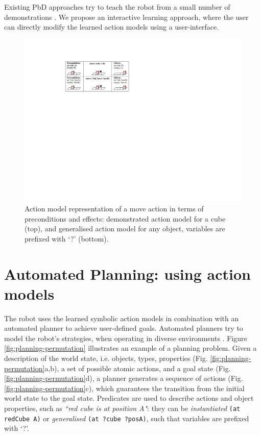 Existing PbD approaches try to teach the robot from a small number of demonstrations \cite{EricM.Orendt2016,abdo2013learning}. We propose an interactive learning approach, where the user can directly modify the learned action models using a user-interface.

  \begin{figure}[!h]
	\centering
	\includegraphics[width=0.7\linewidth]{figures/schema-logic}
	\caption{Action model representation of a move action in terms of preconditions and effects: demonstrated action model for a cube (top), and generalised action model for any object, variables are prefixed with `?' (bottom).}
	\label{fig:action}
\end{figure}

\section{Automated Planning: using action models}\label{sec:AP}
The robot uses the learned symbolic action models in combination with an automated planner to achieve user-defined goals. Automated planners try to model the robot's strategies, when operating in diverse environments \cite{ghallab2004automated}.
Figure \ref{fig:planning-permutation} illustrates an example of a planning problem. Given a description of the world state, i.e. objects, types, properties (Fig. \ref{fig:planning-permutation}a,b), a set of possible atomic actions, and a goal state (Fig. \ref{fig:planning-permutation}d), a planner generates a sequence of actions (Fig. \ref{fig:planning-permutation}c), which guarantees the transition from the initial world state to the goal state. Predicates are used to describe actions and object properties, such as \textit{``red cube is at position A"}: they can be \textit{instantiated} \texttt{(at redCube A)} or \textit{generalised} \texttt{(at ?cube ?posA)}, such that variables are prefixed with `?'.


